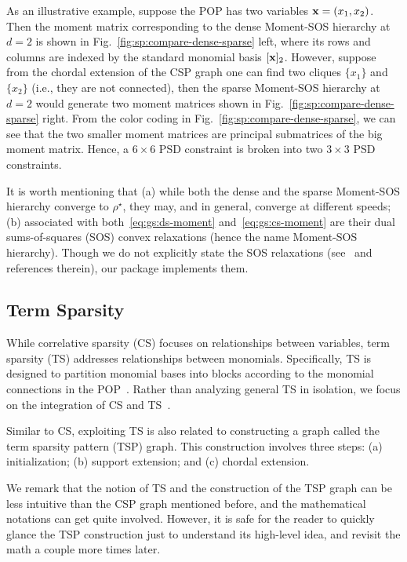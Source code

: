 

As an illustrative example, suppose the POP has two variables $\mathbf{x}=(x_1,x_2)$. Then the moment matrix corresponding to the dense Moment-SOS hierarchy at $d=2$ is shown in Fig.~\ref{fig:sp:compare-dense-sparse} left, where its rows and columns are indexed by the standard monomial basis $[\mathbf{x}]_2$. However, suppose from the chordal extension of the CSP graph one can find two cliques $\{x_1\}$ and $\{x_2\}$ (i.e., they are not connected), then the sparse Moment-SOS hierarchy at $d=2$ would generate two moment matrices shown in Fig.~\ref{fig:sp:compare-dense-sparse} right. From the color coding in Fig.~\ref{fig:sp:compare-dense-sparse}, we can see that the two smaller moment matrices are principal submatrices of the big moment matrix. Hence, a $6 \times 6$ PSD constraint is broken into two $3 \times 3$ PSD constraints.

It is worth mentioning that (a) while both the dense and the sparse Moment-SOS hierarchy converge to $\rho^\star$, they may, and in general, converge at different speeds; (b) associated with both~\eqref{eq:gs:ds-moment} and~\eqref{eq:gs:cs-moment} are their dual sums-of-squares (SOS) convex relaxations (hence the name Moment-SOS hierarchy). Though we do not explicitly state the SOS relaxations (see~\cite{Yang2024book-sdp} and references therein), our \spot package implements them.



\subsection{Term Sparsity}
\label{sec:gs:ts}

While correlative sparsity (CS) focuses on relationships between variables, term sparsity (TS) addresses relationships between monomials. Specifically, TS is designed to partition monomial bases into blocks according to the monomial connections in the POP~\cite{wang2021siam-tssos}. Rather than analyzing general TS in isolation, we focus on the integration of CS and TS~\cite{wang2022tms-cs-tssos}.

Similar to CS, exploiting TS is also related to constructing a graph called the term sparsity pattern (TSP) graph. This construction involves three steps: (a) initialization; (b) support extension; and (c) chordal extension.

We remark that the notion of TS and the construction of the TSP graph can be less intuitive than the CSP graph mentioned before, and the mathematical notations can get quite involved. However, it is safe for the reader to quickly glance the TSP construction just to understand its high-level idea, and revisit the math a couple more times later.


